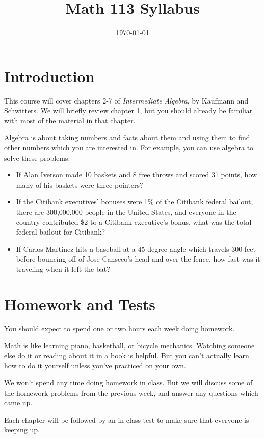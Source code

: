 \documentclass{article}
\title{Math 113 Syllabus}
\date{\today}
\begin{document}
  \maketitle

  \section{Introduction}
  This course will cover chapters 2-7 of {\em Intermediate Algebra}, by Kaufmann and Schwitters.  We will briefly review
  chapter 1, but you should already be familiar with most of the material in that chapter.

  Algebra is about taking numbers and facts about them and using them to find other numbers which you are interested
  in.  For example, you can use algebra to solve these problems:

  \begin{itemize}
    \item If Alan Iverson made 10 baskets and 8 free throws and scored 31 points, how many of his baskets were three pointers?
    \item If the Citibank executives' bonuses were 1\% of the Citibank federal bailout, there are 300,000,000 people in the
      United States, and everyone in the country contributed \$2 to a Citibank executive's bonus, what was the total federal
      bailout for Citibank?
    \item If Carlos Martinez hits a baseball at a 45 degree angle which travels 300 feet before bouncing off of Jose
      Canseco's head and over the fence, how fast was it traveling when it left the bat?
  \end{itemize}

  \section{Homework and Tests}

  You should expect to spend one or two hours each week doing homework.

  Math is like learning piano, basketball, or bicycle mechanics.  Watching someone else do it or reading about it in a
  book is helpful.  But you can't actually learn how to do it yourself unless you've practiced on your own.

  We won't spend any time doing homework in class.  But we will discuss some of the homework problems from the
  previous week, and answer any questions which came up.

  Each chapter will be followed by an in-class test to make sure that everyone is keeping up.
\end{document}

